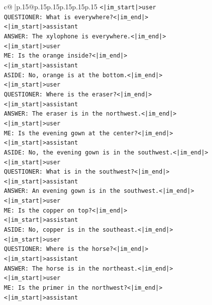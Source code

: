 \documentclass{article}
\begin{document}
{\begin{supertabular}{c@{$\;$}|p{.15\linewidth}@{}p{.15\linewidth}p{.15\linewidth}p{.15\linewidth}p{.15\linewidth}p{.15\linewidth}}
{{{\texttt{<|im\_start|>user} \\
\texttt{QUESTIONER: What is everywhere?<|im\_end|>} \\
\texttt{<|im\_start|>assistant} \\
\texttt{ANSWER: The xylophone is everywhere.<|im\_end|>} \\
\texttt{<|im\_start|>user} \\
\texttt{ME: Is the orange inside?<|im\_end|>} \\
\texttt{<|im\_start|>assistant} \\
\texttt{ASIDE: No, orange is at the bottom.<|im\_end|>} \\
\texttt{<|im\_start|>user} \\
\texttt{QUESTIONER: Where is the eraser?<|im\_end|>} \\
\texttt{<|im\_start|>assistant} \\
\texttt{ANSWER: The eraser is in the northwest.<|im\_end|>} \\
\texttt{<|im\_start|>user} \\
\texttt{ME: Is the evening gown at the center?<|im\_end|>} \\
\texttt{<|im\_start|>assistant} \\
\texttt{ASIDE: No, the evening gown is in the southwest.<|im\_end|>} \\
\texttt{<|im\_start|>user} \\
\texttt{QUESTIONER: What is in the southwest?<|im\_end|>} \\
\texttt{<|im\_start|>assistant} \\
\texttt{ANSWER: An evening gown is in the southwest.<|im\_end|>} \\
\texttt{<|im\_start|>user} \\
\texttt{ME: Is the copper on top?<|im\_end|>} \\
\texttt{<|im\_start|>assistant} \\
\texttt{ASIDE: No, copper is in the southeast.<|im\_end|>} \\
\texttt{<|im\_start|>user} \\
\texttt{QUESTIONER: Where is the horse?<|im\_end|>} \\
\texttt{<|im\_start|>assistant} \\
\texttt{ANSWER: The horse is in the northeast.<|im\_end|>} \\
\texttt{<|im\_start|>user} \\
\texttt{ME: Is the primer in the northwest?<|im\_end|>} \\
\texttt{<|im\_start|>assistant} \\
}}}
\end{supertabular}}
\end{document}

